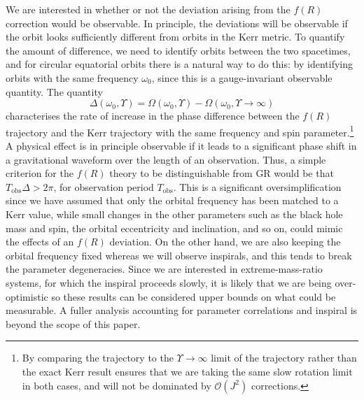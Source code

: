 \documentclass[aps,prd,amsfonts,amssymb,amsmath,nofootinbib,reprint,showpacs]{revtex4-1}
\newcommand{\sub}[1]{\ensuremath{_\text{#1}}}
\newcommand{\order}[1]{\ensuremath{\mathcal{O}({#1})}}
\begin{document}
We are interested in whether or not the deviation arising from the $f(R)$ correction would be observable. In principle, the deviations will be observable if the orbit looks sufficiently different from orbits in the Kerr metric. To quantify the amount of difference, we need to identify orbits between the two spacetimes, and for circular equatorial orbits there is a natural way to do this: by identifying orbits with the same frequency $\omega_0$, since this is a gauge-invariant observable quantity. The quantity
\begin{equation}
\Delta(\omega_0,\Upsilon) = \Omega(\omega_0,\Upsilon)-\Omega(\omega_0,\Upsilon \rightarrow \infty)
\end{equation}
characterises the rate of increase in the phase difference between the $f(R)$ trajectory and the Kerr trajectory with the same frequency and spin parameter.\footnote{By comparing the trajectory to the $\Upsilon \rightarrow\infty$ limit of the trajectory rather than the exact Kerr result ensures that we are taking the same slow rotation limit in both cases, and will not be dominated by $\order{J^2}$ corrections.} A physical effect is in principle observable if it leads to a significant phase shift in a gravitational waveform over the length of an observation. Thus, a simple criterion for the $f(R)$ theory to be distinguishable from GR would be that $T\sub{obs}\Delta > 2\pi$, for observation period $T\sub{obs}$. This is a significant oversimplification since we have assumed that only the orbital frequency has been matched to a Kerr value, while small changes in the other parameters such as the black hole mass and spin, the orbital eccentricity and inclination, and so on, could mimic the effects of an $f(R)$ deviation. On the other hand, we are also keeping the orbital frequency fixed whereas we will observe inspirals, and this tends to break the parameter degeneracies. Since we are interested in extreme-mass-ratio systems, for which the inspiral proceeds slowly, it is likely that we are being over-optimistic so these results can be considered upper bounds on what could be measurable. A fuller analysis accounting for parameter correlations and inspiral is beyond the scope of this paper.
\end{document}
